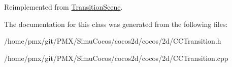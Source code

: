 Reimplemented from \hyperlink{classTransitionScene_a45e39b658189c79428a05c3bc3173bbb}{Transition\+Scene}.



The documentation for this class was generated from the following files\+:\begin{DoxyCompactItemize}
\item 
/home/pmx/git/\+P\+M\+X/\+Simu\+Cocos/cocos2d/cocos/2d/C\+C\+Transition.\+h\item 
/home/pmx/git/\+P\+M\+X/\+Simu\+Cocos/cocos2d/cocos/2d/C\+C\+Transition.\+cpp\end{DoxyCompactItemize}
